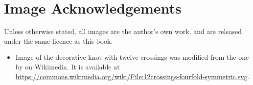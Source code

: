 \chapter{Image Acknowledgements}
Unless otherwise stated, all images are the author's own work, and are released under the same licence as this book.

\begin{itemize}
    \item Image of the decorative knot with twelve crossings was modified from the one by  on Wikimedia. It is available at \url{https://commons.wikimedia.org/wiki/File:12crossings-fourfold-symmetric.svg}.
\end{itemize}
